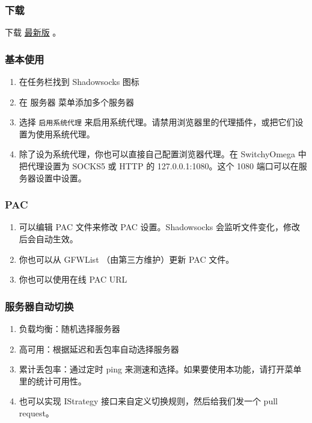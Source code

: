 \documentclass[11pt,a4paper]{sphinxmanual}
\begin{document}
\subsubsection{下载}
\label{sec-2-3-1-2}
下载 \href{https://github.com/shadowsocks/shadowsocks-csharp/releases}{最新版} 。

\subsubsection{基本使用}
\label{sec-2-3-1-3}
\begin{enumerate}
\item 在任务栏找到 Shadowsocks 图标
\item 在 服务器 菜单添加多个服务器
\item 选择 \verb~启用系统代理~ 来启用系统代理。请禁用浏览器里的代理插件，或把它们设置为使用系统代理。
\item 除了设为系统代理，你也可以直接自己配置浏览器代理。在 SwitchyOmega 中把代理设置为 SOCKS5 或 HTTP 的 127.0.0.1:1080。这个 1080 端口可以在服务器设置中设置。
\end{enumerate}

\subsubsection{PAC}
\label{sec-2-3-1-4}
\begin{enumerate}
\item 可以编辑 PAC 文件来修改 PAC 设置。Shadowsocks 会监听文件变化，修改后会自动生效。
\item 你也可以从 GFWList （由第三方维护）更新 PAC 文件。
\item 你也可以使用在线 PAC URL
\end{enumerate}

\subsubsection{服务器自动切换}
\label{sec-2-3-1-5}
\begin{enumerate}
\item 负载均衡：随机选择服务器
\item 高可用：根据延迟和丢包率自动选择服务器
\item 累计丢包率：通过定时 ping 来测速和选择。如果要使用本功能，请打开菜单里的统计可用性。
\item 也可以实现 IStrategy 接口来自定义切换规则，然后给我们发一个 pull request。
\end{enumerate}
\end{document}
